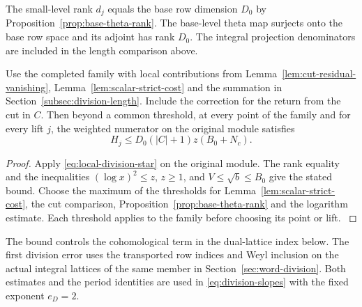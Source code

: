 The small-level rank \(d_j\) equals the base row
dimension \(D_0\) by Proposition~\ref{prop:base-theta-rank}. The base-level theta
map surjects onto the base row space and its adjoint has
rank \(D_0\). The integral projection denominators are
included in the length comparison above.



\begin{proposition}\label{prop:original-weighted-numerator}
Use the completed family with local contributions from
Lemma~\ref{lem:cut-residual-vanishing},
Lemma~\ref{lem:scalar-strict-cost} and the summation in
Section~\ref{subsec:division-length}. Include the correction
for the return from the cut in \(C\). Then beyond a common
threshold, at every point of the family and for every lift \(j\), the
weighted numerator on the original module satisfies
\[
           H_j\le D_0(|C|+1)z(B_0+N_c).
\]
\end{proposition}

\begin{proof}
Apply \eqref{eq:local-division-star} on the original module. The rank equality and the
inequalities \((\log x)^2\le z\), \(z\ge1\), and \(V\le\sqrt b\le B_0\)
give the stated bound. Choose the maximum of the thresholds for
Lemma~\ref{lem:scalar-strict-cost}, the cut comparison,
Proposition~\ref{prop:base-theta-rank} and the logarithm estimate.
Each threshold applies to the family before choosing its point or
lift.
\label{cor:division-length-5}
\end{proof}

The bound controls the cohomological term in the dual-lattice index
below. The first division error uses the transported row indices and
Weyl inclusion on the actual integral lattices of the same member in
Section~\ref{sec:word-division}. Both estimates and the period identities
are used in \eqref{eq:division-slopes} with the fixed exponent \(e_D=2\).

